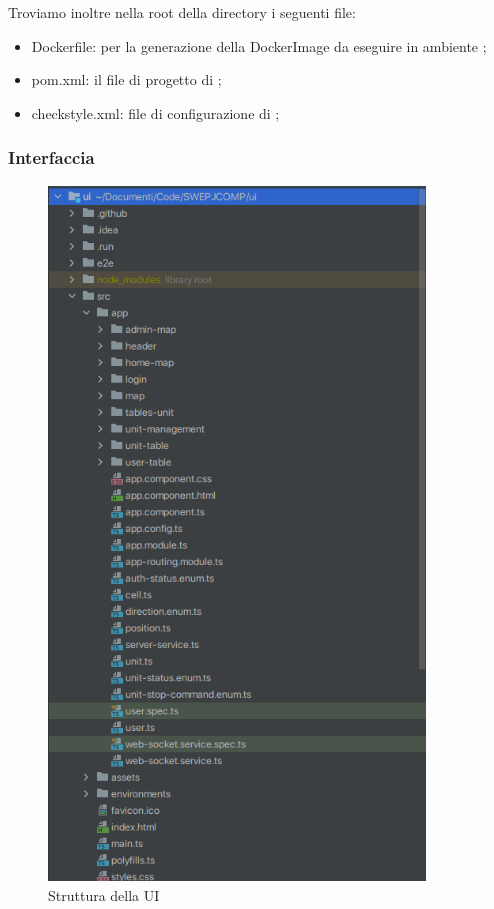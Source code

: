 	Troviamo inoltre nella root della directory i seguenti file:
	\begin{itemize}
		\item{Dockerfile}: per la generazione della DockerImage da eseguire in ambiente ;
		\item{pom.xml}: il file di progetto di ;
		\item{checkstyle.xml}: file di configurazione di ;
	\end{itemize}

\newpage

	\subsubsection{Interfaccia}
	
	\begin{figure}[H]
		\centering
		\includegraphics[width=10cm]{img/struttura_ui.png}
		\caption{Struttura della UI}
	\end{figure}

